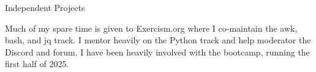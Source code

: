 \documentclass{resume}
\begin{document}
  \begin{rSection}{Independent Projects}
    \begin{rSubsection}{}{}{}{}
      \item Much of my spare time is given to Exercism.org where I co-maintain the awk, bash, and jq track. I mentor heavily on the Python track and help moderator the Discord and forum. I have been heavily involved with the bootcamp, running the first half of 2025.
      \begin{comment}
      \item \textbf{pacman} Contributed patches to the Archlinux package manager, pacman, making use of the newer features of bash
      \item \textbf{newsbeuter} Added features as well as debugged and patched bugs in the ncurses RSS client, newsbeuter
      \item \textbf{irssi} Wrote several scripts to extend the ncurses IRC client, irssi, and was added as a contributor to the Stalker.pl script
      \item \textbf{More...} of my coding and projects are available via my website, \href{http://www.isaacgood.com/}{isaacgood.com}
      \end{comment}
    \end{rSubsection}
  \end{rSection}


\begin{comment}
    \begin{rSubsection}{OANDA Corporation}{Jan 2012 - Mar 2012}{Integrator}{Toronto, ON}
      \item Deployed software packages in a testing environment
      \item Detected and stopped bugs before software reached production machines
      \item Learned the software system on a broad, high level
      \item Interacted and collaborated with members of many other teams across
    \end{rSubsection}
\end{comment}

\begin{comment}
    \begin{rSubsection}{Artificial Perception Laboratory (APL)}{May 2007 - Aug 2007}{Team Lead}{Toronto, ON}
      \item Conducted a broad range of projects to help further APL’s research, advancing APLs position in the industry
      \item Led a team of five volunteer students, delivering instructions on a weekly basis and gathering progress reports
      \item Reported weekly to coordinator and other team leaders allowing the different teams to complement each other's productivity
    \end{rSubsection}
\end{comment}
\end{document}
